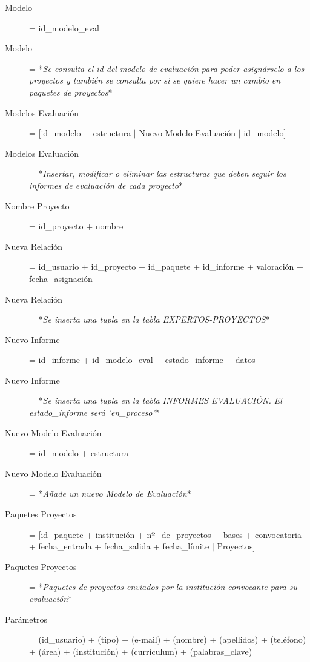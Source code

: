 \documentclass[12pt,a4paper,titlepage,spanish,twoside]{book}
\begin{document}
\begin{description}
\item[Modelo] = id\_modelo\_eval

\item[Modelo] = *\emph{Se consulta el id del modelo de evaluación para poder
    asignárselo a los proyectos y también se consulta por si se quiere hacer
    un cambio en paquetes de proyectos}* 

\item[Modelos Evaluación] = [id\_modelo + estructura $\mid$ Nuevo Modelo
  Evaluación $\mid$ id\_modelo] 

\item[Modelos Evaluación] = *\emph{Insertar, modificar o eliminar las
    estructuras que deben seguir los informes de evaluación de cada
    proyecto}* 

\item[Nombre Proyecto] = id\_proyecto + nombre

\item[Nueva Relación] = id\_usuario + id\_proyecto + id\_paquete +
  id\_informe + valoración + fecha\_asignación 

\item[Nueva Relación] = *\emph{Se inserta una tupla en la tabla
    EXPERTOS-PROYECTOS}* 

\item[Nuevo Informe] = id\_informe + id\_modelo\_eval + estado\_informe + datos

\item[Nuevo Informe] = *\emph{Se inserta una tupla en la tabla INFORMES
    EVALUACIÓN. El estado\_informe será 'en\_proceso'}* 

\item[Nuevo Modelo Evaluación] = id\_modelo + estructura

\item[Nuevo Modelo Evaluación] = *\emph{Añade un nuevo Modelo de Evaluación}*

\item[Paquetes Proyectos] = [id\_paquete + institución + nº\_de\_proyectos +
  bases + convocatoria + fecha\_entrada + fecha\_salida + fecha\_límite
  $\mid$ Proyectos] 

\item[Paquetes Proyectos] = *\emph{Paquetes de proyectos enviados por la
    institución convocante para su evaluación}* 

\item[Parámetros] = (id\_usuario) + (tipo) + (e-mail) + (nombre) +
  (apellidos) + (teléfono) + (área) + (institución) + (currículum) +
  (palabras\_clave) 


\end{description}
\end{document}
